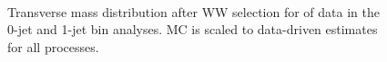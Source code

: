 \begin{figure}[!hbtp]
\centering
{}
 \\
\caption{Transverse mass distribution after WW selection for \intlumiEightTeV of data 
in the 0-jet  and 1-jet  bin analyses. 
MC is scaled to data-driven estimates for all processes.}
\label{fig:ww_mt}
\end{figure}

